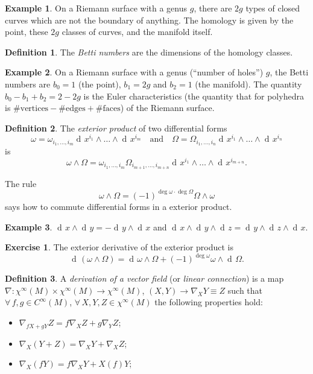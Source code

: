 \documentclass[a4paper,12pt]{book}
\newcommand{\dd}{\mathop{\mathrm{d}\!}{}}
\theoremstyle{definition}
\newtheorem{definition}{Definition}
\newtheorem{example}{Example}
\newtheorem{exercise}{Exercise}
\theoremstyle{remark}
\begin{document}
\begin{example}
On a Riemann surface with a genus $g$, there are $2g$ types of closed curves which are not the boundary of anything. The homology is given by the point, these $2g$ classes of curves, and the manifold itself.
\end{example}

\begin{definition}
The \emph{Betti numbers} are the dimensions of the homology classes.
\end{definition}

\begin{example}
On a Riemann surface with a genus (``number of holes'') $g$, the Betti numbers are $b_0=1$ (the point), $b_1=2g$ and $b_2=1$ (the manifold). The quantity $b_0-b_1+b_2=2-2g$ is the Euler characteristics (the quantity that for polyhedra is $\text{\#vertices}-\text{\#edges}+\text{\#faces}$) of the Riemann surface.
\end{example}

\begin{definition}
The \emph{exterior product} of two differential forms
\[\omega=\omega_{i_1,\ldots,i_m}\dd x^{i_1}\wedge\ldots\wedge\dd x^{i_m}\quad\text{and}\quad\Omega=\Omega_{i_1,\ldots,i_n}\dd x^{i_1}\wedge\ldots\wedge\dd x^{i_n}\]
is
\[\omega\wedge\Omega=\omega_{i_1,\ldots,i_m}\Omega_{i_{m+1},\ldots,i_{m+n}}\dd x^{i_1}\wedge\ldots\wedge\dd x^{i_{m+n}}.\]
\end{definition}

The rule
\[\omega\wedge\Omega=(-1)^{\deg\omega\cdot\deg\Omega}\Omega\wedge\omega\]
says how to commute differential forms in a exterior product.

\begin{example}
$\dd x\wedge\dd y=-\dd y\wedge\dd x$ and $\dd x\wedge\dd y\wedge\dd z=\dd y\wedge\dd z\wedge\dd x$.
\end{example}

\begin{exercise}
The exterior derivative of the exterior product is
\[\dd(\omega\wedge\Omega)=\dd\omega\wedge\Omega+(-1)^{\deg\omega}\omega\wedge\dd\Omega.\]
\end{exercise}

\begin{definition}
A \emph{derivation of a vector field} (or \emph{linear connection}) is a map $\nabla\colon \chi^\infty(M)\times\chi^\infty(M)\to\chi^\infty(M)$, $(X,Y)\to\nabla_XY\equiv Z$ such that $\forall\, f,g\in C^\infty(M)$, $\forall\,X,Y,Z\in\chi^\infty(M)$ the following properties hold:
\begin{itemize}
\item $\nabla_{fX+gY}Z=f\nabla_XZ+g\nabla_YZ$;
\item $\nabla_X(Y+Z)=\nabla_XY+\nabla_XZ$;
\item $\nabla_X(fY)=f\nabla_XY+X(f)Y$;
\end{itemize}
\end{definition}
\end{document}
